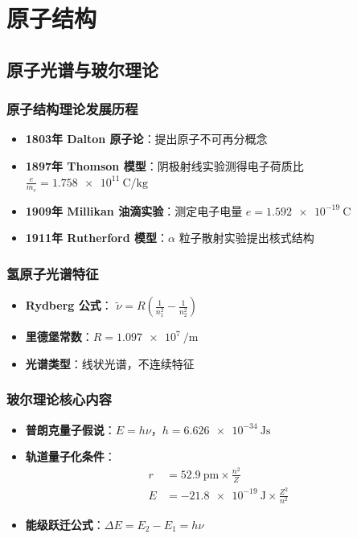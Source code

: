 \documentclass{article}
\begin{document}
\section{原子结构}
\subsection{原子光谱与玻尔理论}

\subsubsection{原子结构理论发展历程}
\begin{itemize}
    \item \textbf{1803年 Dalton 原子论}：提出原子不可再分概念
    \item \textbf{1897年 Thomson 模型}：阴极射线实验测得电子荷质比 $\frac{e}{m_e} = \SI{1.758e11}{\coulomb\per\kilo\gram}$
    \item \textbf{1909年 Millikan 油滴实验}：测定电子电量 $e = \SI{1.592e-19}{\coulomb}$
    \item \textbf{1911年 Rutherford 模型}：$\alpha$ 粒子散射实验提出核式结构
\end{itemize}

\subsubsection{氢原子光谱特征}
\begin{itemize}
    \item \textbf{Rydberg 公式}：
        $\tilde{\nu} = R\left(\frac{1}{n_1^2} - \frac{1}{n_2^2}\right)$
    \item \textbf{里德堡常数}：$R = \SI{1.097e7}{\per\meter}$
    \item \textbf{光谱类型}：线状光谱，不连续特征
\end{itemize}

\subsubsection{玻尔理论核心内容}
\begin{itemize}
    \item \textbf{普朗克量子假说}：$E = h\nu$，$h = \SI{6.626e-34}{\joule\second}$
    \item \textbf{轨道量子化条件}：
        \begin{align*}
        r &= \SI{52.9}{\pico\meter} \times \frac{n^2}{Z} \\
        E &= -\SI{21.8e-19}{\joule} \times \frac{Z^2}{n^2}
        \end{align*}
    \item \textbf{能级跃迁公式}：$\Delta E = E_2 - E_1 = h\nu$
\end{itemize}
\end{document}
